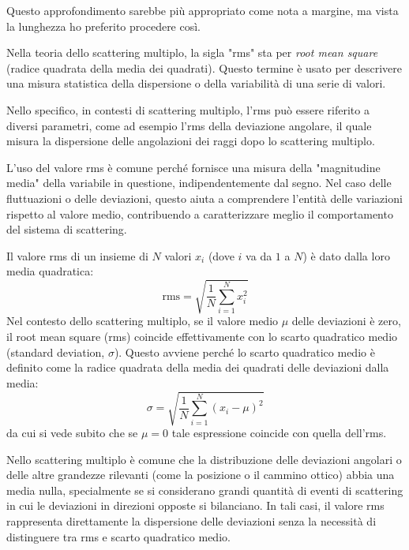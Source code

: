 \begin{approfondimento}\label{appr:rms}
    \footnotesize
    Questo approfondimento sarebbe più appropriato come nota a margine, ma vista la lunghezza ho preferito procedere così.

    \vspace{0.2cm}Nella teoria dello scattering multiplo, la sigla "rms" sta per \textit{root mean square} (radice quadrata della media dei quadrati). Questo termine è usato per descrivere una misura statistica della dispersione o della variabilità di una serie di valori.

    Nello specifico, in contesti di scattering multiplo, l'rms può essere riferito a diversi parametri, come ad esempio l'rms della deviazione angolare, il quale misura la dispersione delle angolazioni dei raggi dopo lo scattering multiplo.
    
    L'uso del valore rms è comune perché fornisce una misura della "magnitudine media" della variabile in questione, indipendentemente dal segno. Nel caso delle fluttuazioni o delle deviazioni, questo aiuta a comprendere l'entità delle variazioni rispetto al valore medio, contribuendo a caratterizzare meglio il comportamento del sistema di scattering.
    
    Il valore rms di un insieme di $N$ valori $x_i$ (dove $i$ va da $1$ a $N$) è dato dalla loro media quadratica:
    \begin{equation*}
        \textstyle \text{rms}
        =\sqrt{\frac{1}{N}\sum_{i=1}^{N} x_i^2}
    \end{equation*}
    Nel contesto dello scattering multiplo, se il valore medio $\mu$ delle deviazioni è zero, il root mean square (rms) coincide effettivamente con lo scarto quadratico medio (standard deviation, $\sigma$). Questo avviene perché lo scarto quadratico medio è definito come la radice quadrata della media dei quadrati delle deviazioni dalla media:
    \begin{equation*}
        \textstyle \sigma
        =\sqrt{\frac{1}{N}\sum_{i=1}^{N} (x_i - \mu)^2}
    \end{equation*}
    da cui si vede subito che se $\mu=0$ tale espressione coincide con quella dell'rms.
    
    Nello scattering multiplo è comune che la distribuzione delle deviazioni angolari o delle altre grandezze rilevanti (come la posizione o il cammino ottico) abbia una media nulla, specialmente se si considerano grandi quantità di eventi di scattering in cui le deviazioni in direzioni opposte si bilanciano. In tali casi, il valore rms rappresenta direttamente la dispersione delle deviazioni senza la necessità di distinguere tra rms e scarto quadratico medio.
\end{approfondimento}

